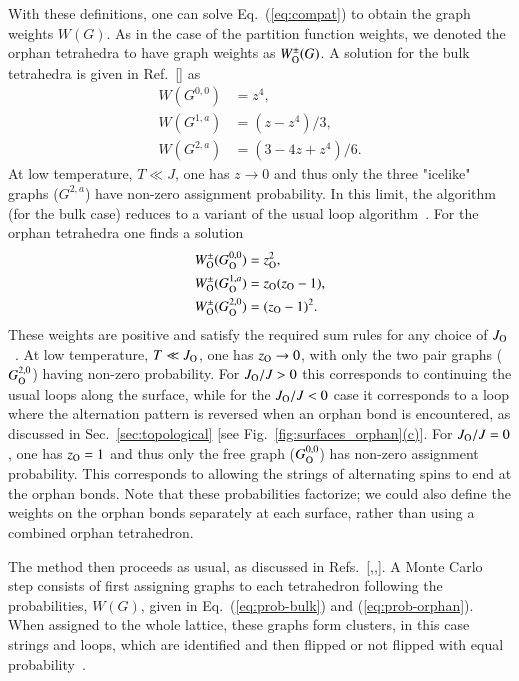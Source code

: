 \documentclass[aps,prx,reprint,runinaddress,superscriptaddress,amsmath,amssymb,floatfix,longbibliography]{revtex4-1}
\newcommand{\Jo}{J_{\rm O}}
\newcommand{\subref}[2]{\ref{#1}\hyperref[#1]{#2}}
\begin{document}
With these definitions, one can solve Eq.~(\ref{eq:compat}) to obtain the graph weights $W(G)$. As in the case of the partition function weights, we denoted the orphan tetrahedra to have graph weights as $W^{\pm}_{\rm O}(G)$. A solution for the bulk tetrahedra is given in Ref.~[] as
\begin{align}
W(G^{0,0}) &= z^4, \nonumber \\
W(G^{1,a}) &= (z-z^4)/3, \nonumber \\
W(G^{2,a}) &= (3-4z+z^4)/6.
\label{eq:prob-bulk}
\end{align}
At low temperature, $T \ll J$, one has $z \rightarrow 0$ and thus only the three "icelike" graphs ($G^{2,a}$) have non-zero assignment probability. In this limit, the algorithm (for the bulk case) reduces to a variant of the usual loop algorithm~\cite{Melko2001}. For the orphan tetrahedra one finds a solution
\begin{align}
W^\pm_{\rm O}(G^{0,0}_{\rm O}) &= z_{\rm O}^2, \nonumber \\
W^\pm_{\rm O}(G^{1,a}_{\rm O}) &= z_{\rm O}(z_{\rm O}-1), \nonumber \\
W^\pm_{\rm O}(G^{2,0}_{\rm O}) &= (z_{\rm O}-1)^2.
\label{eq:prob-orphan}
\end{align}
These weights are positive and satisfy the required sum rules for any choice of $\Jo$~\cite{otsuka-2014-cluster}. At low temperature, $T \ll \Jo$, one has $z_{\rm O} \rightarrow 0$, with only the two pair graphs ($G^{2,0}_{\rm O}$) having non-zero probability. For $\Jo/J>0$ this corresponds to continuing the usual loops along the surface, while for the $\Jo/J<0$ case it corresponds to a loop where the alternation pattern is reversed when an orphan bond is encountered, as discussed in Sec.~\ref{sec:topological} [see Fig.~\subref{fig:surfaces_orphan}{(c)}]. For $\Jo/J = 0$, one has $z_{\rm O} = 1$ and thus only the free graph ($G^{0,0}_{\rm O}$) has non-zero assignment probability. This corresponds to allowing the strings of alternating spins to end at the orphan bonds. Note that these probabilities factorize; we could also define the weights on the orphan bonds separately at each surface, rather than using a combined orphan tetrahedron.

The method then proceeds as usual, as discussed in Refs.~[,,]. A Monte Carlo step consists of first assigning graphs to each tetrahedron following the probabilities, $W(G)$, given in Eq.~(\ref{eq:prob-bulk}) and (\ref{eq:prob-orphan}). When assigned to the whole lattice, these graphs form clusters, in this case strings and loops, which are identified and then flipped or not flipped with equal probability~\cite{swensden-1987-nonuniversal}.

%

\end{document}
